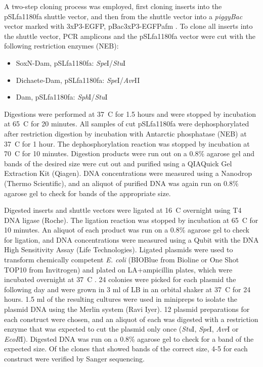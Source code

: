 A two-step cloning process was employed, first cloning inserts into the pSLfa1180fa shuttle vector, and then from the shuttle vector into a \emph{piggyBac} vector marked with 3xP3-EGFP, pBac{3xP3-EGFPafm} \citep{horn_versatile_2000}. To clone all inserts into the shuttle vector, PCR amplicons and the pSLfa1180fa vector were cut with the following restriction enzymes (NEB):
\begin{itemize}
	\item SoxN-Dam, pSLfa1180fa: \emph{Spe}I/\emph{Stu}I
	\item Dichaete-Dam, pSLfa1180fa: \emph{Spe}I/\emph{Avr}II
	\item Dam, pSLfa1180fa: \emph{Sph}I/\emph{Stu}I
\end{itemize}
Digestions were performed at 37\degree~C for 1.5 hours and were stopped by incubation at 65\degree~C for 20 minutes. All samples of cut pSLfa1180fa were dephosphorylated after restriction digestion by incubation with Antarctic phosphatase (NEB) at 37\degree~C for 1 hour. The dephosphorylation reaction was stopped by incubation at 70\degree~C for 10 minutes. Digestion products were run out on a 0.8\% agarose gel and bands of the desired size were cut out and purified using a QIAQuick Gel Extraction Kit (Qiagen). DNA concentrations were measured using a Nanodrop (Thermo Scientific), and an aliquot of purified DNA was again run on 0.8\% agarose gel to check for bands of the appropriate size.
  
Digested inserts and shuttle vectors were ligated at 16\degree~C overnight using T4 DNA ligase (Roche). The ligation reaction was stopped by incubation at 65\degree~C for 10 minutes. An aliquot of each product was run on a 0.8\% agarose gel to check for ligation, and DNA concentrations were measured using a Qubit with the DNA High Sensitivity Assay (Life Technologies). Ligated plasmids were used to transform chemically competent \emph{E. coli} (BIOBlue from Bioline or One Shot TOP10 from Invitrogen) and plated on LA+ampicillin plates, which were incubated overnight at 37\degree~C . 24 colonies were picked for each plasmid the following day and were grown in 3 ml of LB in an orbital shaker at 37\degree~C for 24 hours. 1.5 ml of the resulting cultures were used in minipreps to isolate the plasmid DNA using the Merlin system (Ravi Iyer). 12 plasmid preparations for each construct were chosen, and an aliquot of each was digested with a restriction enzyme that was expected to cut the plasmid only once (\emph{Stu}I, \emph{Spe}I, \emph{Avr}I or \emph{EcoR}I). Digested DNA was run on a 0.8\% agarose gel to check for a band of the expected size. Of the clones that showed bands of the correct size, 4-5 for each construct were verified by Sanger sequencing.

